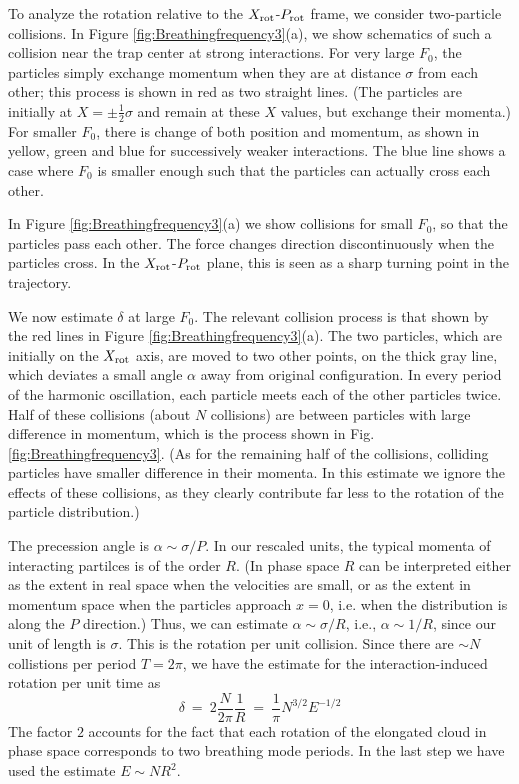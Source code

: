 \documentclass[aps,preprintnumbers,onecolumn,amsmath,amssymb,floatfix,pra]{revtex4-1}
\begin{document}



To analyze the rotation relative to the $X_{\rm rot}$-$P_{\rm rot}$ frame, we consider two-particle
collisions.  In Figure \ref{fig:Breathingfrequency3}(a), we show schematics of such a collision near
the trap center at strong interactions.  For very large $F_0$, the particles simply exchange momentum
when they are at distance $\sigma$ from each other; this process is shown in red as two straight
lines.  (The particles are initially at $X=\pm\frac{1}{2}\sigma$ and remain at these $X$ values,
but exchange their momenta.)   For smaller $F_0$, there is change of both position and momentum, as shown in yellow, green
and blue for successively weaker interactions. The blue line shows a case where $F_0$ is smaller
enough such that the particles can actually cross each other.

In Figure \ref{fig:Breathingfrequency3}(a) we show collisions for small $F_0$, so that the particles
pass each other.  The force changes direction discontinuously when the particles cross.  In the
$X_{\rm rot}$-$P_{\rm rot}$ plane, this is seen as a sharp turning point in the trajectory.

We now estimate $\delta$ at large $F_0$.  The relevant collision process is that shown by the red
lines in Figure \ref{fig:Breathingfrequency3}(a).  The two particles, which are initially on the
$X_{\rm rot}$ axis, are moved to two other points, on the thick gray line, which deviates a small
angle $\alpha$ away from original configuration.  In every period of the harmonic oscillation, each
particle meets each of the other particles twice.  Half of these collisions (about $N$ collisions)
are between particles with large difference in momentum, which is the process shown in
Fig.\ref{fig:Breathingfrequency3}.  (As for the remaining half of the collisions, colliding
particles have smaller difference in their momenta.  In this estimate we ignore the effects of these
collisions, as they clearly contribute far less to the rotation of the particle distribution.)

The precession angle is $\alpha\sim \sigma/P$.  In our rescaled units, the typical momenta of
interacting partilces is of the order $R$.  (In phase space $R$ can be interpreted either as the
extent in real space when the velocities are small, or as the extent in momentum space when the
particles approach $x=0$, i.e. when the distribution is along the $P$ direction.)  Thus, we can
estimate $\alpha\sim \sigma/R$, i.e., $\alpha\sim 1/R$, since our unit of length is $\sigma$.  This
is the rotation per unit collision.  Since there are $\sim N$ collistions per period $T=2\pi$, we
have the estimate for the interaction-induced rotation per unit time as
\begin{equation}
\delta ~=~ 2 \frac{N}{2\pi} \frac{1}{R} ~=~  \frac{1}{\pi}  N^{3/2}E^{-1/2}
\label{eq:breathingfrequency1}
\end{equation}
The factor $2$ accounts for the fact that each rotation of the elongated cloud in phase space
corresponds to two breathing mode periods.  In the last step we have used the estimate $E\sim
NR^2$. 
\end{document}
